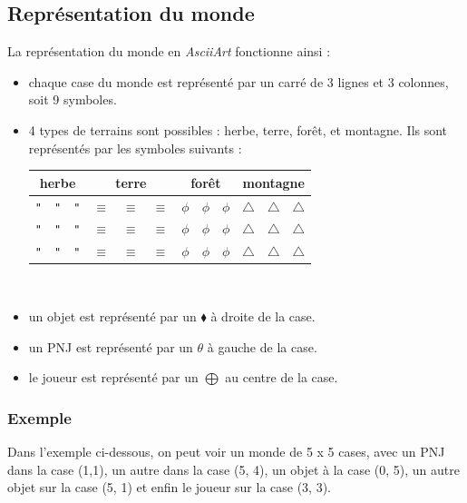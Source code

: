 \documentclass[asi]{picINSA}
\begin{document}
\subsection{Représentation du monde}
La représentation du monde en \textit{AsciiArt} fonctionne ainsi :
\begin{itemize}
\item chaque case du monde est représenté par un carré de 3 lignes et 3 colonnes, soit 9 symboles.
\item 4 types de terrains sont possibles : herbe, terre, forêt, et montagne. Ils sont représentés par les symboles suivants : \\
\begin{tabular}{| c c c | c c c | c c c | c c c | }
 \hline		
  \multicolumn{3}{|c|}{herbe} & \multicolumn{3}{|c|}{terre} & \multicolumn{3}{|c|}{forêt} & \multicolumn{3}{|c|}{montagne} \\	
\hline
    \verb+"+ & \verb+"+ & \verb+"+ & $\equiv$ & $\equiv$ & $\equiv$ & $\phi$ & $\phi$ & $\phi$ & $\triangle$ & $\triangle$ & $\triangle$ \\
    \verb+"+ & \verb+"+ & \verb+"+ & $\equiv$ & $\equiv$ & $\equiv$ & $\phi$ & $\phi$ & $\phi$ & $\triangle$ & $\triangle$ & $\triangle$ \\
    \verb+"+ & \verb+"+ & \verb+"+ & $\equiv$ & $\equiv$ & $\equiv$ & $\phi$ & $\phi$ & $\phi$ & $\triangle$ & $\triangle$ & $\triangle$ \\
 \hline  
 \end{tabular}
~\\
\item un objet est représenté par un $\blacklozenge$ à droite de la case.
\item un PNJ est représenté par un $\theta$ à gauche de la case.
\item le joueur est représenté par un $\bigoplus$ au centre de la case.
\end{itemize}

\subsubsection{Exemple}
Dans l'exemple ci-dessous, on peut voir un monde de 5 x 5 cases, avec un PNJ dans la case (1,1), un autre dans la case (5, 4), un objet à la case (0, 5), un autre objet sur la case (5, 1) et enfin le joueur sur la case (3, 3).
\end{document}
